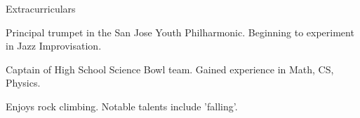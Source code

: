 \documentclass{resume} %
\begin{document}

\begin{rSection}{Extracurriculars} \itemsep -5pt

\item Principal trumpet in the San Jose Youth Philharmonic. Beginning to experiment in Jazz Improvisation. 
\item Captain of High School Science Bowl team. Gained experience in Math, CS, Physics. 
\item Enjoys rock climbing. Notable talents include 'falling'. 
\end{rSection}
\end{document}
